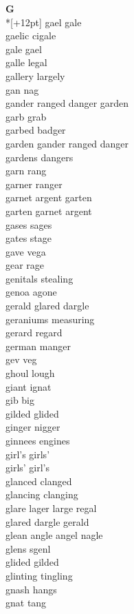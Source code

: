 \vspace{14pt}
\noindent\textbf{\Large G}\\*[+12pt]
gael gale\\
gaelic cigale\\
gale gael\\
galle legal\\
gallery largely\\
gan nag\\
gander ranged danger garden\\
garb grab\\
garbed badger\\
garden gander ranged danger\\
gardens dangers\\
garn rang\\
garner ranger\\
garnet argent garten\\
garten garnet argent\\
gases sages\\
gates stage\\
gave vega\\
gear rage\\
genitals stealing\\
genoa agone\\
gerald glared dargle\\
geraniums measuring\\
gerard regard\\
german manger\\
gev veg\\
ghoul lough\\
giant ignat\\
gib big\\
gilded glided\\
ginger nigger\\
ginnees engines\\
girl's girls'\\
girls' girl's\\
glanced clanged\\
glancing clanging\\
glare lager large regal\\
glared dargle gerald\\
glean angle angel nagle\\
glens sgenl\\
glided gilded\\
glinting tingling\\
gnash hangs\\
gnat tang\\
